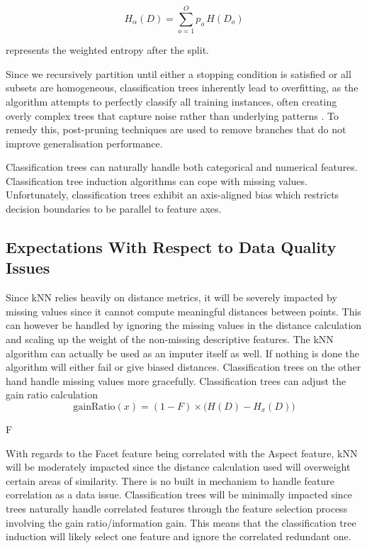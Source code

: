 \documentclass[10pt, conference]{IEEEtran}
\begin{document}
\[
H_\alpha(D) = \sum_{o=1}^{O} p_o \, H(D_o)
\]

represents the weighted entropy after the split.

Since we recursively partition until either a stopping condition is satisfied or all subsets are homogeneous, classification trees inherently lead to overfitting, as the algorithm attempts to perfectly classify all training instances, often creating overly complex trees that capture noise rather than underlying patterns \cite{quinlan1993c45}. To remedy this, post-pruning techniques are used to remove branches that do not improve generalisation performance.

Classification trees can naturally handle both categorical and numerical features. Classification tree induction algorithms can cope with missing values. Unfortunately, classification trees exhibit an axis-aligned bias which restricts decision boundaries to be parallel to feature axes.

\subsection{Expectations With Respect to Data Quality Issues}
Since kNN relies heavily on distance metrics, it will be severely impacted by missing values since it cannot compute meaningful distances between points. This can however be handled by ignoring the missing values in the distance calculation and scaling up the weight of the non-missing descriptive features. The kNN algorithm can actually be used as an imputer itself as well. If nothing is done the algorithm will either fail or give biased distances. Classification trees on the other hand handle missing values more gracefully. Classification trees can adjust the gain ratio calculation 
\[
\text{gainRatio}(x) = (1 - F) \times \big( H(D) - H_x(D) \big)
\]

 F 



With regards to the Facet feature being correlated with the Aspect feature, kNN will be moderately impacted since the distance calculation used will overweight certain areas of similarity. There is no built in mechanism to handle feature correlation as a data issue. Classification trees will be minimally impacted since trees naturally handle correlated features through the feature selection process involving the gain ratio/information gain. This means that the classification tree induction will likely select one feature and ignore the correlated redundant one.
\end{document}
